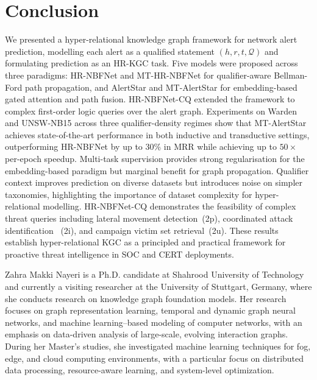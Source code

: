 \documentclass[10pt,journal,compsoc]{IEEEtran}
\begin{document}
\section{Conclusion}
\label{sec:conclusion}

We presented a hyper-relational knowledge graph
framework for network alert prediction, modelling
each alert as a qualified statement
$(h, r, t, \mathcal{Q})$ and formulating prediction
as an HR-KGC task. Five models were proposed across
three paradigms: HR-NBFNet and MT-HR-NBFNet for
qualifier-aware Bellman-Ford path propagation, and
AlertStar and MT-AlertStar for embedding-based
gated attention and path fusion. HR-NBFNet-CQ
extended the framework to complex first-order logic
queries over the alert graph.
Experiments on Warden and UNSW-NB15 across three
qualifier-density regimes show that MT-AlertStar
achieves state-of-the-art performance in both
inductive and transductive settings, outperforming
HR-NBFNet by up to 30\% in MRR while achieving up
to $50{\times}$ per-epoch speedup. Multi-task
supervision provides strong regularisation for the
embedding-based paradigm but marginal benefit for
graph propagation. Qualifier context improves
prediction on diverse datasets but introduces noise
on simpler taxonomies, highlighting the importance
of dataset complexity for hyper-relational modelling.
HR-NBFNet-CQ demonstrates the feasibility of
complex threat queries including lateral movement
detection~(2p), coordinated attack identification
~(2i), and campaign victim set retrieval~(2u).
These results establish hyper-relational KGC as a
principled and practical framework for proactive
threat intelligence in SOC and CERT deployments.




\begin{IEEEbiographynophoto}{Zahra Makki Nayeri}
is a Ph.D. candidate at Shahrood University of Technology and currently a visiting researcher at the University of Stuttgart, Germany, where she conducts research on knowledge graph foundation models. Her research focuses on graph representation learning, temporal and dynamic graph neural networks, and machine learning–based modeling of computer networks, with an emphasis on data-driven analysis of large-scale, evolving interaction graphs. During her Master’s studies, she investigated machine learning techniques for fog, edge, and cloud computing environments, with a particular focus on distributed data processing, resource-aware learning, and system-level optimization.
    
\end{IEEEbiographynophoto}
\end{document}
